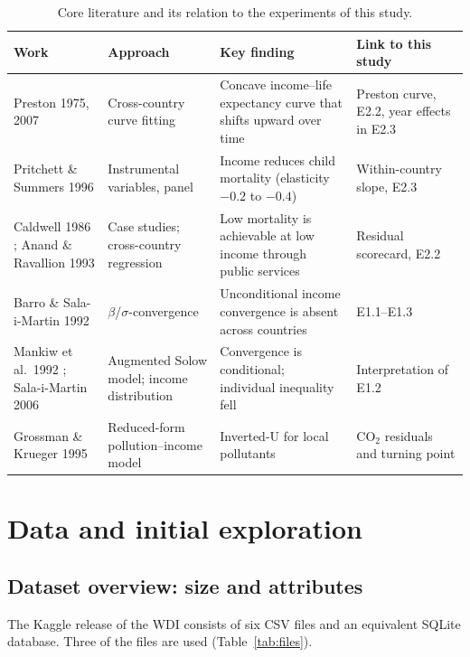 \documentclass[11pt,a4paper]{article}
\begin{document}
\begin{table}[htbp]\centering\footnotesize
\caption{Core literature and its relation to the experiments of this study.}\label{tab:lit}
\begin{tabular}{p{3.0cm}p{3.2cm}p{5.0cm}p{3.6cm}}
\toprule
Work & Approach & Key finding & Link to this study \\
\midrule
Preston 1975, 2007 \cite{preston,preston07} & Cross-country curve fitting & Concave income--life expectancy curve that shifts upward over time & Preston curve, E2.2, year effects in E2.3 \\
Pritchett \& Summers 1996 \cite{pritchett} & Instrumental variables, panel & Income reduces child mortality (elasticity $-0.2$ to $-0.4$) & Within-country slope, E2.3 \\
Caldwell 1986 \cite{caldwell}; Anand \& Ravallion 1993 \cite{anand} & Case studies; cross-country regression & Low mortality is achievable at low income through public services & Residual scorecard, E2.2 \\
Barro \& Sala-i-Martin 1992 \cite{barro} & $\beta$/$\sigma$-convergence & Unconditional income convergence is absent across countries & E1.1--E1.3 \\
Mankiw et al.\ 1992 \cite{mrw}; Sala-i-Martin 2006 \cite{sala06} & Augmented Solow model; income distribution & Convergence is conditional; individual inequality fell & Interpretation of E1.2 \\
Grossman \& Krueger 1995 \cite{grossman} & Reduced-form pollution--income model & Inverted-U for local pollutants & CO$_2$ residuals and turning point \\
\bottomrule
\end{tabular}
\end{table}

\section{Data and initial exploration}\label{sec:A}

\subsection{Dataset overview: size and attributes}
The Kaggle release of the WDI consists of six CSV files and an equivalent SQLite database. Three of the files are used (Table~\ref{tab:files}).
\end{document}
